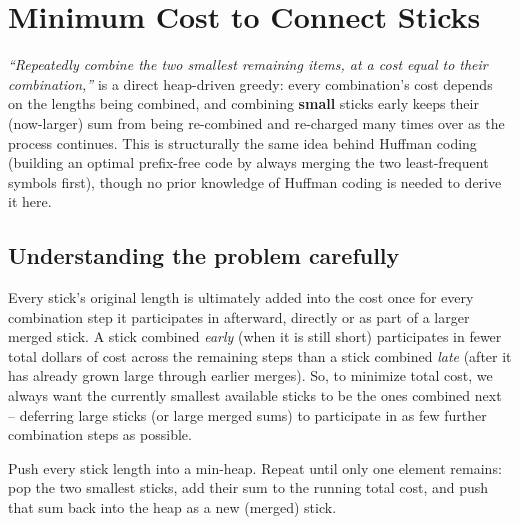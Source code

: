 \section{Minimum Cost to Connect Sticks}
\label{sec:heap-connect-sticks}


\begin{patternbox}
\emph{``Repeatedly combine the two smallest remaining items, at a cost
equal to their combination,''} is a direct heap-driven greedy: every
combination's cost depends on the lengths being combined, and combining
\textbf{small} sticks early keeps their (now-larger) sum from being
re-combined and re-charged many times over as the process continues. This
is structurally the same idea behind Huffman coding (building an optimal
prefix-free code by always merging the two least-frequent symbols first),
though no prior knowledge of Huffman coding is needed to derive it here.
\end{patternbox}

\subsection*{Understanding the problem carefully}

Every stick's original length is ultimately added into the cost once for
every combination step it participates in afterward, directly or as part
of a larger merged stick. A stick combined \emph{early} (when it is still
short) participates in fewer total dollars of cost across the remaining
steps than a stick combined \emph{late} (after it has already grown large
through earlier merges). So, to minimize total cost, we always want the
currently smallest available sticks to be the ones combined next --
deferring large sticks (or large merged sums) to participate in as few
further combination steps as possible.

\begin{ideabox}
Push every stick length into a min-heap. Repeat until only one element
remains: pop the two smallest sticks, add their sum to the running total
cost, and push that sum back into the heap as a new (merged) stick.
\end{ideabox}

